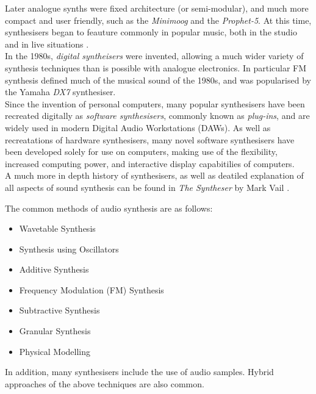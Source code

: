 \documentclass[11pt, oneside]{report}   	%
\begin{document}
Later analogue synths were fixed architecture (or semi-modular), and much more compact and user friendly, such as the \emph{Minimoog} and the \emph{Prophet-5}. At this time, synthesisers began to feauture commonly in popular music, both in the studio and in live situations \cite{Synth}.\\
In the 1980s, \emph{digital syntheisers} were invented, allowing a much wider variety of synthesis techniques than is possible with analogue electronics. In particular FM synthesis defined much of the musical sound of the 1980s, and was popularised by the Yamaha \emph{DX7} synthesiser.\\
Since the invention of personal computers, many popular synthesisers have been recreated digitally as \emph{software synthesisers}, commonly known as \emph{plug-ins}, and are widely used in modern Digital Audio Workstations (DAWs). As well as recreatations of hardware synthesisers, many novel software synthesisers have been developed solely for use on computers, making use of the flexibility, increased computing power, and interactive display capabitilies of computers.\\
A much more in depth history of synthesisers, as well as deatiled explanation of all aspects of sound synthesis can be found in \emph{The Syntheser} by Mark Vail \cite{Synth}.

The common methods of audio synthesis are as follows: \cite{SynthTypes}
\begin{itemize}
	\vspace{-10pt}
	\setlength\itemsep{-1.2em}
	\item Wavetable Synthesis
	\item Synthesis using Oscillators
	\item Additive Synthesis
	\item Frequency Modulation (FM) Synthesis
	\item Subtractive Synthesis
	\item Granular Synthesis
	\item Physical Modelling
		\vspace{-10pt}
\end{itemize}
In addition, many synthesisers include the use of audio samples. Hybrid approaches of the above techniques are also common.
\end{document}
